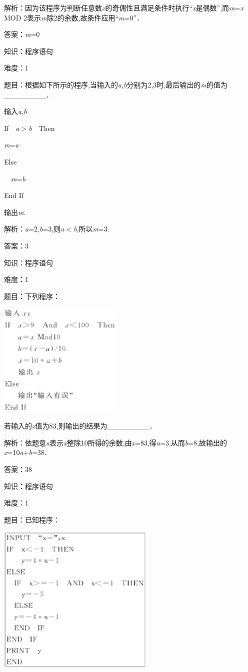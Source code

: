 \documentclass{article} %
\begin{document}
解析：因为该程序为判断任意数\textit{x}的奇偶性且满足条件时执行``\textit{x}是偶数'',而\textit{m}=\textit{x} MOD 2表示\textit{m}除2的余数,故条件应用``\textit{m}=0''．

答案：\textit{m}=0

知识：程序语句

难度：1

题目：根据如下所示的程序,当输入的\textit{a},\textit{b}分别为2,3时,最后输出的\textit{m}的值为\_\_\_\_\_\_\_\_．

输入\textit{a},\textit{b}

If　\textit{a}$\mathrm{>}$\textit{b}　Then

\textit{m}=\textit{a}

Else

　\textit{m}=\textit{b}

End If

输出\textit{m}.

解析：\textit{a}=2,\textit{b}=3,则\textit{a}$\mathrm{<}$\textit{b},所以\textit{m}=3.

答案：3

知识：程序语句

难度：1

题目：下列程序：

\includegraphics*[width=2.35in, height=2.16in, keepaspectratio=false]{image50}

若输入的\textit{x}值为83,则输出的结果为\_\_\_\_\_\_\_\_．

解析：依题意\textit{a}表示\textit{x}整除10所得的余数,由\textit{x}=83,得\textit{a}=3,从而\textit{b}=8,故输出的\textit{x}=10\textit{a}+\textit{b}=38.

答案：38

知识：程序语句

难度：1

题目：已知程序：

\includegraphics*[width=2.98in, height=2.84in, keepaspectratio=false]{image51}
\end{document}
